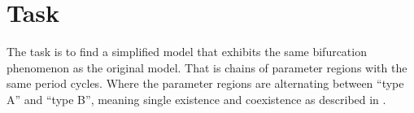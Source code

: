 \chapter{Task}

The task is to find a simplified model that exhibits the same bifurcation phenomenon as the original model.
That is chains of parameter regions with the same period cycles.
Where the parameter regions are alternating between ``type A'' and ``type B'', meaning single existence and coexistence as described in .

